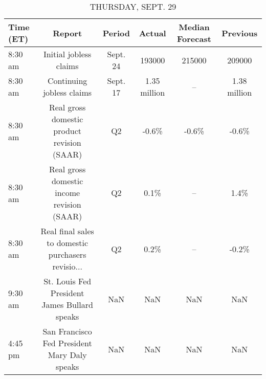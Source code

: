 \documentclass{article}%
\begin{document}
\begin{table}[htbp]%
\caption{THURSDAY, SEPT. 29}%
\centering%
\begin{adjustbox}{width=1\textwidth}%
\begin{tabular}{lccccc}
\toprule
Time (ET) &                                             Report &   Period &       Actual & Median Forecast &     Previous \\
\midrule
  8:30 am &                             Initial jobless claims & Sept. 24 &       193000 &          215000 &       209000 \\
  8:30 am &                          Continuing jobless claims & Sept. 17 & 1.35 million &              -- & 1.38 million \\
  8:30 am &        Real gross domestic product revision (SAAR) &       Q2 &        -0.6\% &           -0.6\% &        -0.6\% \\
  8:30 am &         Real gross domestic income revision (SAAR) &       Q2 &         0.1\% &              -- &         1.4\% \\
  8:30 am & Real final sales to domestic purchasers revisio... &       Q2 &         0.2\% &              -- &        -0.2\% \\
  9:30 am &       St. Louis Fed President James Bullard speaks &      NaN &          NaN &             NaN &          NaN \\
  4:45 pm &       San Francisco Fed President Mary Daly speaks &      NaN &          NaN &             NaN &          NaN \\
\bottomrule
\end{tabular}
%
\end{adjustbox}%
\end{table}

%
\end{document}
